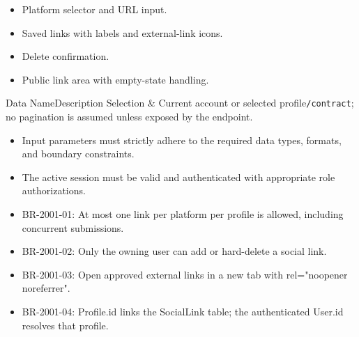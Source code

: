 \begin{itemize}[leftmargin=1.6em,topsep=3pt,itemsep=2pt,parsep=0pt,label=$\bullet$]
    \item Platform selector and URL input.
    \item Saved links with labels and external-link icons.
    \item Delete confirmation.
    \item Public link area with empty-state handling.
\end{itemize}


\begin{specdatatable}{Data Name}{Description}
Selection & Current account or selected profile\texttt{/\allowbreak{}contract}; no pagination is assumed unless exposed by the endpoint.\\ \hline
\end{specdatatable}

\begin{itemize}[leftmargin=1.6em,topsep=3pt,itemsep=2pt,parsep=0pt,label=$\bullet$]
    \item Input parameters must strictly adhere to the required data types, formats, and boundary constraints.
    \item The active session must be valid and authenticated with appropriate role authorizations.
\end{itemize}

\begin{itemize}[leftmargin=1.6em,topsep=3pt,itemsep=2pt,parsep=0pt,label=$\bullet$]\brrulelist
    \item BR-2001-01: At most one link per platform per profile is allowed, including concurrent submissions.
    \item BR-2001-02: Only the owning user can add or hard-delete a social link.
    \item BR-2001-03: Open approved external links in a new tab with rel="noopener noreferrer".
    \item BR-2001-04: Profile.id links the SocialLink table; the authenticated User.id resolves that profile.
\end{itemize}

